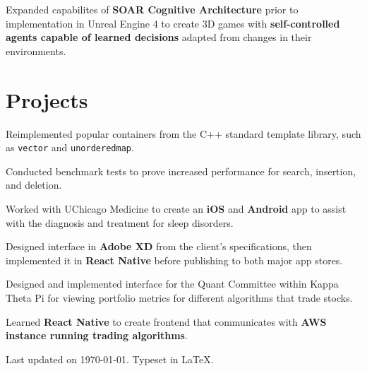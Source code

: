 \documentclass{hreeves_resume}
\begin{document}
\begin{minipage}[t]{0.6\linewidth}
\infosep
{}
\begin{smallItemize}
\item Expanded capabilites of \textbf{SOAR Cognitive Architecture} prior to implementation in Unreal Engine 4 to create 3D games with \textbf{self-controlled agents capable of learned decisions} adapted from changes in their environments.
\end{smallItemize}

\section{Projects}

\begin{smallItemize}
\item Reimplemented popular containers from the C++ standard template library, such as \texttt{vector} and \texttt{unordered\textunderscore map}.
\item Conducted benchmark tests to prove increased performance for search, insertion, and deletion.
\end{smallItemize}

\infosep

\begin{smallItemize}
\item Worked with UChicago Medicine to create an \textbf{iOS} and \textbf{Android} app to assist with the diagnosis and treatment for sleep disorders.
\item Designed interface in \textbf{Adobe XD} from the client's specifications, then implemented it in \textbf{React Native} before publishing to both major app stores.
\end{smallItemize}

\infosep

\begin{smallItemize}

\item Designed and implemented interface for the Quant Committee within Kappa Theta Pi for viewing portfolio metrics for different algorithms that trade stocks.
\item Learned \textbf{React Native} to create frontend that communicates with \textbf{AWS instance running trading algorithms}.
\end{smallItemize}
\end{minipage}



  \vspace*{\fill}

  \begin{center}
\fontsize{8pt}{12pt}\selectfont Last updated on \today. Typeset in \LaTeX.
  \end{center}
  \vspace*{\fill}
\end{document}
